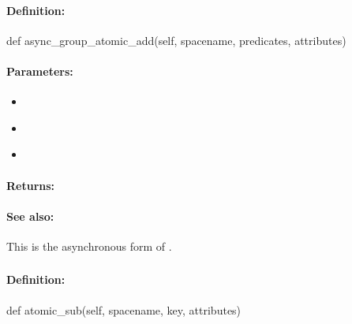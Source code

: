 \paragraph{Definition:}
\begin{pythoncode}
def async_group_atomic_add(self, spacename, predicates, attributes)
\end{pythoncode}

\paragraph{Parameters:}
\begin{itemize}[noitemsep]
\item {}\\

\item {}\\

\item {}\\

\end{itemize}

\paragraph{Returns:}


\paragraph{See also:}  This is the asynchronous form of .

\pagebreak
\subsubsection{}
\label{api:python:atomic_sub}


\paragraph{Definition:}
\begin{pythoncode}
def atomic_sub(self, spacename, key, attributes)
\end{pythoncode}

